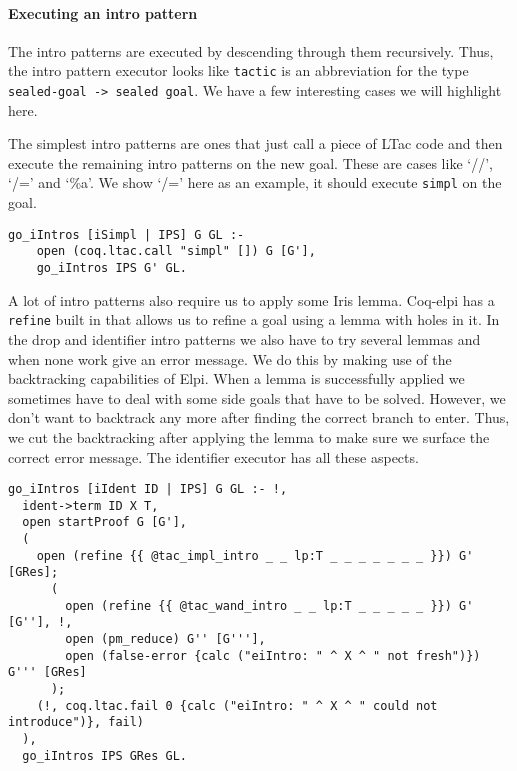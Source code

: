 \documentclass[thesis.tex]{subfiles}
\begin{document}
\paragraph*{Executing an intro pattern}
The intro patterns are executed by descending through them recursively. Thus, the intro pattern executor looks like  \texttt{tactic} is an abbreviation for the type \texttt{sealed-goal -> sealed goal}. We have a few interesting cases we will highlight here.

The simplest intro patterns are ones that just call a piece of LTac code and then execute the remaining intro patterns on the new goal. These are cases like `//', `/=' and `\%a'. We show `/=' here as an example, it should execute \texttt{simpl} on the goal.
\begin{verbatim}
go_iIntros [iSimpl | IPS] G GL :-
    open (coq.ltac.call "simpl" []) G [G'],
    go_iIntros IPS G' GL.
\end{verbatim}

A lot of intro patterns also require us to apply some Iris lemma. Coq-elpi has a \texttt{refine} built in that allows us to refine a goal using a lemma with holes in it. In the drop and identifier intro patterns we also have to try several lemmas and when none work give an error message. We do this by making use of the backtracking capabilities of Elpi. When a lemma is successfully applied we sometimes have to deal with some side goals that have to be solved. However, we don't want to backtrack any more after finding the correct branch to enter. Thus, we cut the backtracking after applying the lemma to make sure we surface the correct error message. The identifier executor has all these aspects.
\begin{verbatim}
go_iIntros [iIdent ID | IPS] G GL :- !,
  ident->term ID X T,
  open startProof G [G'],
  (
    open (refine {{ @tac_impl_intro _ _ lp:T _ _ _ _ _ _ _ }}) G' [GRes];
      (
        open (refine {{ @tac_wand_intro _ _ lp:T _ _ _ _ _ }}) G' [G''], !,
        open (pm_reduce) G'' [G'''],
        open (false-error {calc ("eiIntro: " ^ X ^ " not fresh")}) G''' [GRes]
      );
    (!, coq.ltac.fail 0 {calc ("eiIntro: " ^ X ^ " could not introduce")}, fail)
  ),
  go_iIntros IPS GRes GL.
\end{verbatim}
\end{document}
